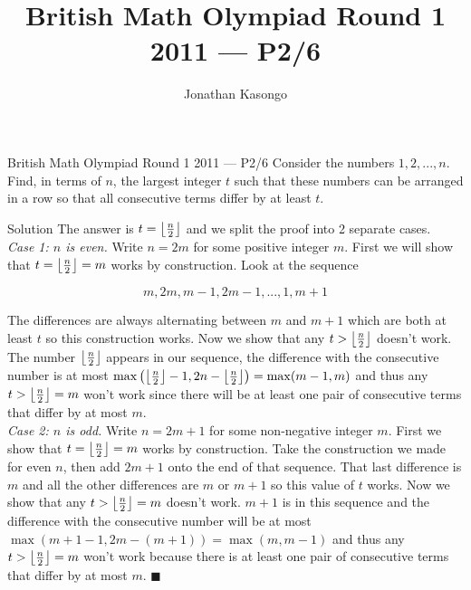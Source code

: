 \documentclass{article}
\author{Jonathan Kasongo}
\title{British Math Olympiad Round 1 2011 --- P2/6}
\begin{document}
\maketitle

\begin{problem}{British Math Olympiad Round 1 2011 --- P2/6}
Consider the numbers $1, 2, . . . , n$. Find, in terms of
$n$, the largest
integer $t$ such that these numbers can be arranged in a row so that all
consecutive terms differ by at least $t$.
\end{problem}

\begin{solution}{Solution}
The answer is $t = \left\lfloor \frac{n}{2} \right\rfloor$ and we split the proof into 2
separate cases.\\

\textit{Case 1: $n$ is even.} Write $n = 2m$ for some positive integer $m$.
First we will show that $t = \left\lfloor \frac{n}{2} \right\rfloor = m$ works by
construction. Look at the sequence

$$
m, 2m, m-1, 2m-1, ..., 1, m+1
$$

The differences are always alternating between $m$ and $m+1$ which are both
at least $t$ so this construction works. Now we show that any $t >
\left\lfloor \frac{n}{2} \right\rfloor$ doesn't work. The number $\left\lfloor \frac{n}{2} \right\rfloor$
appears in our sequence, the difference with the consecutive number is at
most $\max\left(\left\lfloor \frac{n}{2} \right\rfloor-1, 2n - \left\lfloor \frac{n}{2} \right\rfloor\right)=
\max(m-1, m)$ and thus any $t > \left\lfloor \frac{n}{2} \right\rfloor = m$ won't work since
there will be at least one pair of consecutive terms that differ by
at most $m$. \\

\textit{Case 2: $n$ is odd.} Write $n = 2m+1$ for some non-negative integer
$m$. First we show that $t = \left\lfloor \frac{n}{2} \right\rfloor = m$ works by
construction. Take the construction we made for even $n$, then add
$2m+1$ onto the end of that sequence. That last difference is $m$ and all
the other differences are $m$ or $m+1$ so this value of $t$ works. Now we
show that any $t > \left\lfloor \frac{n}{2} \right\rfloor = m$ doesn't work. $m+1$ is in this
sequence and the difference with the consecutive number will be at most
$\max(m+1-1, 2m-(m+1)) = \max(m, m-1)$ and thus any
$t > \left\lfloor \frac{n}{2} \right\rfloor = m$ won't work because there is at least one pair
of consecutive terms that differ by at most $m$. $\blacksquare$
\end{solution}
\end{document}
